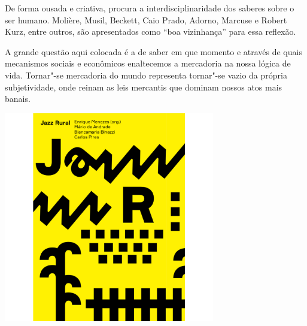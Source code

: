 \hspace*{-7cm}\hrulefill\hspace*{-7cm}

\medskip

\noindent{}De forma ousada e criativa, {} procura a interdisciplinaridade dos saberes sobre o ser humano. Molière, Musil, Beckett, Caio Prado, Adorno, Marcuse e Robert Kurz, entre outros, são apresentados como “boa vizinhança” para essa reflexão. 

A grande questão aqui colocada é a de saber em que momento e através de quais mecanismos sociais e econômicos enaltecemos a mercadoria na nossa lógica de vida. Tornar"-se mercadoria do mundo representa tornar"-se vazio da própria subjetividade, onde reinam as leis mercantis que dominam nossos atos mais banais. 

\vfill

\hspace*{-.4cm}\begin{minipage}[c]{.5\linewidth}
\small{
{}}
\end{minipage}

\pagebreak


\hspace{.5cm}

\begin{center}
\hspace*{.5cm}\includegraphics[width=92mm]{./grid/jazz.jpg}
\end{center}

